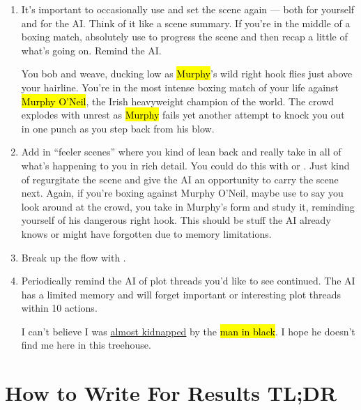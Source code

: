 \documentclass[Avsfag-main.tex]{subfiles}
\begin{document}
\begin{enumerate}
\item
  It's important to occasionally use \story and set the scene again ---
  both for yourself and for the AI. Think of it like a scene summary. If
  you're in the middle of a boxing match, absolutely use \story to
  progress the scene and then recap a little of what's going on. Remind
  the AI.

\begin{storyb}
	\story You bob and weave, ducking low as \hl{Murphy}'s wild right hook flies just above your hairline.
	You're in the most intense boxing match of your life against \hl{Murphy O'Neil}, the Irish heavyweight champion of the world.
	The crowd explodes with unrest as \hl{Murphy} fails yet another attempt to knock you out in one punch as you step back from his blow.
\end{storyb}
\item
  Add in ``feeler scenes'' where you kind of lean back and really take
  in all of what's happening to you in rich detail. You could do this
  with \Do or \story. Just kind of regurgitate the scene and give the AI
  an opportunity to carry the scene next. Again, if you're boxing
  against Murphy O'Neil, maybe use \Do to say you look around at the
  crowd, you take in Murphy's form and study it, reminding yourself of
  his dangerous right hook. This should be stuff the AI already knows or
  might have forgotten due to memory limitations.
\item
  Break up the flow with .
\item
  Periodically remind the AI of plot threads you'd like to see
  continued. The AI has a limited memory and will forget important or
  interesting plot threads within 10 actions.

    \begin{storyb}
	\say I can't believe I was \ul{almost kidnapped} by the \hl{man in black}.
	I hope he doesn't find me here in this treehouse.
    \end{storyb}
\end{enumerate}

\section{How to Write For Results TL;DR}
\end{document}
